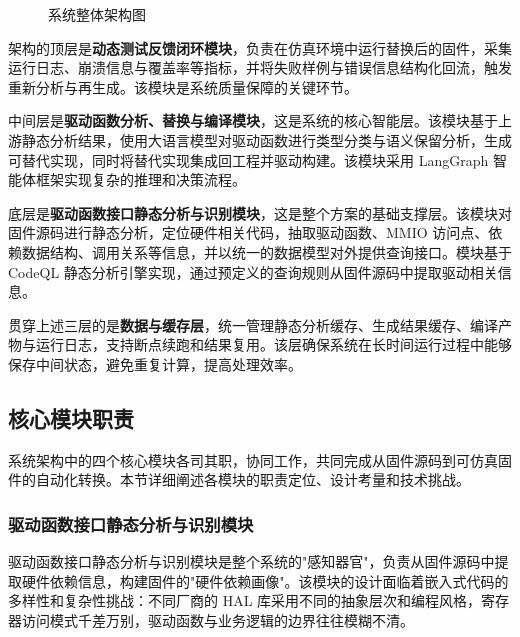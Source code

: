 \begin{figure}[htbp]
\caption{系统整体架构图}
\label{fig:arch}
\end{figure}

架构的顶层是\textbf{动态测试反馈闭环模块}，负责在仿真环境中运行替换后的固件，采集运行日志、崩溃信息与覆盖率等指标，并将失败样例与错误信息结构化回流，触发重新分析与再生成。该模块是系统质量保障的关键环节。

中间层是\textbf{驱动函数分析、替换与编译模块}，这是系统的核心智能层。该模块基于上游静态分析结果，使用大语言模型对驱动函数进行类型分类与语义保留分析，生成可替代实现，同时将替代实现集成回工程并驱动构建。该模块采用 LangGraph 智能体框架实现复杂的推理和决策流程。

底层是\textbf{驱动函数接口静态分析与识别模块}，这是整个方案的基础支撑层。该模块对固件源码进行静态分析，定位硬件相关代码，抽取驱动函数、MMIO 访问点、依赖数据结构、调用关系等信息，并以统一的数据模型对外提供查询接口。模块基于 CodeQL 静态分析引擎实现，通过预定义的查询规则从固件源码中提取驱动相关信息。

贯穿上述三层的是\textbf{数据与缓存层}，统一管理静态分析缓存、生成结果缓存、编译产物与运行日志，支持断点续跑和结果复用。该层确保系统在长时间运行过程中能够保存中间状态，避免重复计算，提高处理效率。

\subsection{核心模块职责}

系统架构中的四个核心模块各司其职，协同工作，共同完成从固件源码到可仿真固件的自动化转换。本节详细阐述各模块的职责定位、设计考量和技术挑战。

\subsubsection{驱动函数接口静态分析与识别模块}

驱动函数接口静态分析与识别模块是整个系统的"感知器官"，负责从固件源码中提取硬件依赖信息，构建固件的"硬件依赖画像"。该模块的设计面临着嵌入式代码的多样性和复杂性挑战：不同厂商的 HAL 库采用不同的抽象层次和编程风格，寄存器访问模式千差万别，驱动函数与业务逻辑的边界往往模糊不清。

